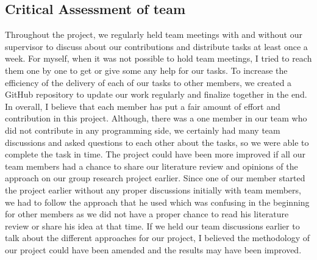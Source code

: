 \documentclass[conference]{IEEEtran}
\begin{document}
\subsection{Critical Assessment of team}
Throughout the project, we regularly held team meetings with and without our supervisor to discuss about our contributions and distribute tasks at least once a week. For myself, when it was not possible to hold team meetings, I tried to reach them one by one to get or give some any help for our tasks. To increase the efficiency of the delivery of each of our tasks to other members, we created a GitHub repository to update our work regularly and finalize together in the end. In overall, I believe that each member has put a fair amount of effort and contribution in this project. Although, there was a one member in our team who did not contribute in any programming side, we certainly had many team discussions and asked questions to each other about the tasks, so we were able to complete the task in time. The project could have been more improved if all our team members had a chance to share our literature review and opinions of the approach on our group research project earlier. Since one of our member started the project earlier without any proper discussions initially with team members, we had to follow the approach that he used which was confusing in the beginning for other members as we did not have a proper chance to read his literature review or share his idea at that time. If we held our team discussions earlier to talk about the different approaches for our project, I believed the methodology of our project could have been amended and the results may have been improved.
\end{document}
